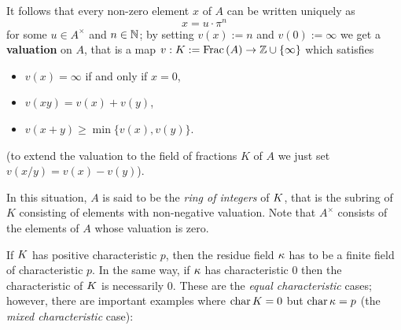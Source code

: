 \documentclass[a4paper, oneside]{memoir}
\begin{document}
It follows that every non-zero element $x$ of $A$ can be written uniquely as
\begin{equation}\label{eq:DVR}
    x=u\cdot\pi^n
\end{equation}
for some $u\in A^\times$ and $n\in\mathbb{N}$; by setting $v(x):=n$ and $v(0):=\infty$ we get a \textbf{valuation} on $A$, that is a map $v:K:=\operatorname{Frac}{(A)}\to\mathbb{Z}\cup\{\infty\}$ which satisfies
\begin{itemize}
    \item $v(x)=\infty$ if and only if $x=0$,
    \item $v(xy)=v(x)+v(y)$,
    \item $v(x+y)\geq\min\{v(x),v(y)\}$.
\end{itemize}
(to extend the valuation to the field of fractions $K$ of $A$ we just set $v(x/y)=v(x)-v(y)$).

In this situation, $A$ is said to be the \textit{ring of integers} of $K$, that is the subring of $K$ consisting of elements with non-negative valuation. Note that $A^\times$ consists
of the elements of $A$ whose valuation is zero.

\begin{remark}
    If \(K\) has positive characteristic \(p\), then the residue field \(\kappa\) has to be a finite field of characteristic \(p\). In the same way, if \(\kappa\) has characteristic \(0\) then
    the characteristic of \(K\) is necessarily \(0\). These are the \textit{equal characteristic} cases; however, there are important examples where \(\operatorname{char}{K}=0\)
    but \(\operatorname{char}{\kappa}=p\) (the \textit{mixed characteristic} case):
\end{remark}
\end{document}
